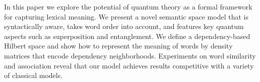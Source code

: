 In this paper we explore the potential of quantum theory as a formal framework for capturing lexical meaning. We present a novel semantic
 space model that is syntactically aware, takes word order into
 account, and features key quantum aspects such as superposition and
 entanglement. We define a dependency-based Hilbert space and show how
 to represent the meaning of words by density matrices that encode
 dependency neighborhoods. Experiments on word similarity and
 association reveal that our model achieves results competitive with
 a variety of classical models.

